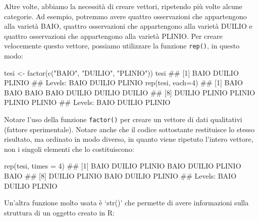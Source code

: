 \documentclass[a4paper,12pt,oneside]{book}
\newenvironment{Shaded}{\begin{snugshade}}{\end{snugshade}}
\newcommand{\DecValTok}[1]{#1}
\newcommand{\StringTok}[1]{#1}
\newcommand{\DocumentationTok}[1]{#1}
\newcommand{\OtherTok}[1]{#1}
\newcommand{\FunctionTok}[1]{#1}
\newcommand{\AttributeTok}[1]{#1}
\newcommand{\NormalTok}[1]{#1}
\begin{document}
Altre volte, abbiamo la necessità di creare vettori, ripetendo più volte alcune categorie. Ad esempio, potremmo avere quattro osservazioni che appartengono alla varietà BAIO, quattro osservazioni che appartengono alla varietà DUILIO e quattro osservazioni che appartengono alla varietà PLINIO. Per creare velocemente questo vettore, possiamo utilizzare la funzione \texttt{rep()}, in questo modo:

\begin{Shaded}
\begin{Highlighting}[]
\NormalTok{tesi  }\OtherTok{\textless{}{-}}  \FunctionTok{factor}\NormalTok{(}\FunctionTok{c}\NormalTok{(}\StringTok{"BAIO"}\NormalTok{, }\StringTok{"DUILIO"}\NormalTok{, }\StringTok{"PLINIO"}\NormalTok{))}
\NormalTok{tesi}
\DocumentationTok{\#\# [1] BAIO   DUILIO PLINIO}
\DocumentationTok{\#\# Levels: BAIO DUILIO PLINIO}
\FunctionTok{rep}\NormalTok{(tesi, }\AttributeTok{each=}\DecValTok{4}\NormalTok{)}
\DocumentationTok{\#\#  [1] BAIO   BAIO   BAIO   BAIO   DUILIO DUILIO DUILIO}
\DocumentationTok{\#\#  [8] DUILIO PLINIO PLINIO PLINIO PLINIO}
\DocumentationTok{\#\# Levels: BAIO DUILIO PLINIO}
\end{Highlighting}
\end{Shaded}

Notare l'uso della funzione \texttt{factor()} per creare un vettore di dati qualitativi (fattore sperimentale). Notare anche che il codice sottostante restituisce lo stesso risultato, ma ordinato in modo diverso, in quanto viene ripetuto l'intero vettore, non i singoli elementi che lo costituiscono:

\begin{Shaded}
\begin{Highlighting}[]
\FunctionTok{rep}\NormalTok{(tesi, }\AttributeTok{times =} \DecValTok{4}\NormalTok{)}
\DocumentationTok{\#\#  [1] BAIO   DUILIO PLINIO BAIO   DUILIO PLINIO BAIO  }
\DocumentationTok{\#\#  [8] DUILIO PLINIO BAIO   DUILIO PLINIO}
\DocumentationTok{\#\# Levels: BAIO DUILIO PLINIO}
\end{Highlighting}
\end{Shaded}

Un'altra funzione molto usata è `str()' che permette di avere informazioni sulla struttura di un oggetto creato in R:

\begin{Shaded}
\end{Shaded}
\end{document}
